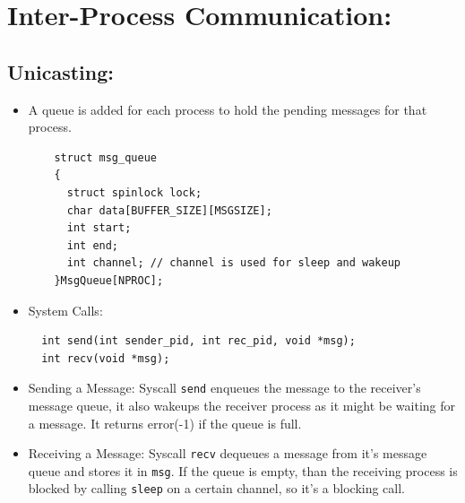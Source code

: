 \documentclass[a4 paper]{article}
\newcommand{\code}[1]{\texttt{#1}}
\begin{document}


\section{Inter-Process Communication:}

\subsection*{Unicasting:}
\begin{itemize}
  \item A queue is added for each process to hold the pending messages for that process.
  \begin{lstlisting}
    struct msg_queue
    {
      struct spinlock lock;
      char data[BUFFER_SIZE][MSGSIZE];
      int start;
      int end;
      int channel; // channel is used for sleep and wakeup
    }MsgQueue[NPROC];
  \end{lstlisting}

  \item System Calls:
  \begin{lstlisting}
  int send(int sender_pid, int rec_pid, void *msg);
  int recv(void *msg);
  \end{lstlisting}
  \item Sending a Message: Syscall \code{send} enqueues the message to the receiver's message queue, it also wakeups the receiver process as it might be waiting for a message. It returns error(-1) if the queue is full.
  \item Receiving a Message: Syscall \code{recv} dequeues a message from it's message queue and stores it in \code{msg}. If the queue is empty, than the receiving process is blocked by calling \code{sleep} on a certain channel, so it's a blocking call.

\end{itemize}
\end{document}
